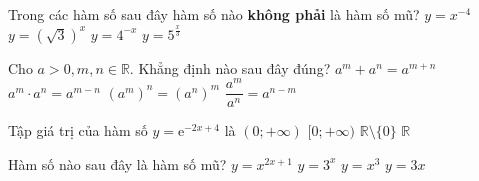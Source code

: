 

\begin{ex}%
	Trong các hàm số sau  đây hàm số nào \textbf{không phải} là hàm số mũ?
	 \choice
		 {\True$y=x^{-4}$}
		{$y=\left(  \sqrt{3}\right) ^x$}
		{$y=4^{-x}$} 
		{$y=5^{\frac{x}{3}}$} 
\end{ex}

\begin{ex}%
	Cho $ a>0,m,n\in \mathbb{R}$. Khẳng  định nào sau đây đúng?
	\choice 
		 {${a^m}+{a^n}={a^{m+n}}$}
		{${a^m}\cdot {a^n}={a^{m-n}}$} 
		 {\True ${({a^m})^n}={({a^n})^m}$}
		 {$\dfrac{{a^m}}{{a^n}}={a^{n-m}}$}
\end{ex}

\begin{ex}%
	Tập giá trị của hàm số  $y=\mathrm{e}^{-2x+4}$ là
	\choice 
		 {\True$(0;+\infty)$}
		{$[0;+\infty)$} 
		 {$\mathbb{R}\setminus\{0\}$}
		 {$\mathbb{R}$}
\end{ex}

\begin{ex}%
	Hàm số nào sau  đây là hàm số mũ?
	\choice 
		{$y=x^{2 x+1}$} 
		{\True $y=3^x$} 
		 {$y=x^3$}
		{$y=3  x$}
\end{ex}



